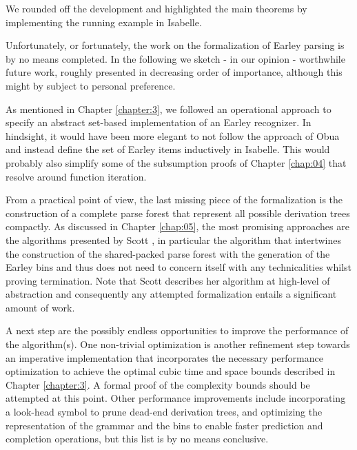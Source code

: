 \begin{isabellebody}
\begin{isamarkuptext}
We rounded off the development and highlighted the main theorems by implementing the running example
in Isabelle.%
\end{isamarkuptext}\isamarkuptrue%
%
\isadelimdocument
%
\endisadelimdocument
%
\isatagdocument
%
\isamarkuptrue%
%
\endisatagdocument
{\isafolddocument}%
%
\isadelimdocument
%
\endisadelimdocument
%
\begin{isamarkuptext}%
Unfortunately, or fortunately, the work on the formalization of Earley parsing is by no means completed. In the following
we sketch - in our opinion - worthwhile future work, roughly presented in decreasing order of importance,
although this might by subject to personal preference.

As mentioned in Chapter \ref{chapter:3}, we followed an operational approach to specify an abstract
set-based implementation of an Earley recognizer. In hindsight, it would have been more elegant to not
follow the approach of Obua and instead define the set of Earley items inductively in Isabelle. This
would probably also simplify some of the subsumption proofs of Chapter \ref{chap:04} that resolve around
function iteration.

From a practical point of view, the last missing piece of the formalization is the construction of a
complete parse forest that represent all possible derivation trees compactly. As discussed in Chapter \ref{chap:05},
the most promising approaches are the algorithms presented by Scott \cite{Scott:2008}, in particular
the algorithm that intertwines the construction of the shared-packed parse forest with the generation of
the Earley bins and thus does not need to concern itself with any technicalities whilst proving termination.
Note that Scott describes her algorithm at high-level of abstraction and consequently any attempted
formalization entails a significant amount of work.

A next step are the possibly endless opportunities to improve the performance of the algorithm(s).
One non-trivial optimization is another refinement step towards an imperative implementation that incorporates the
necessary performance optimization to achieve the optimal cubic time and space bounds described in
Chapter \ref{chapter:3}. A formal proof of the complexity bounds should be attempted at this point.
Other performance improvements include incorporating a look-head symbol to prune dead-end derivation
trees, and optimizing the representation of the grammar and the bins to enable faster prediction and
completion operations, but this list is by no means conclusive.


\end{isamarkuptext}
\end{isabellebody}
